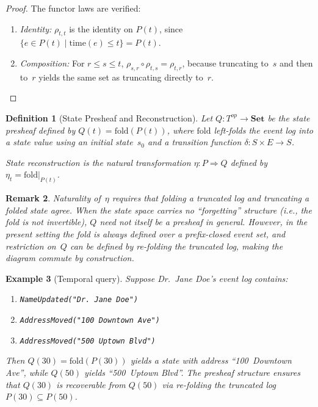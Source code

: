 \documentclass[11pt,a4paper]{article}
\newtheorem{definition}{Definition}[section]
\newtheorem{example}[definition]{Example}
\newtheorem{remark}[definition]{Remark}
\begin{document}
\begin{proof}
The functor laws are verified:
\begin{enumerate}
  \item \emph{Identity:} $\rho_{t,t}$ is the identity on $P(t)$,
    since $\{e\in P(t)\mid\mathrm{time}(e)\le t\}=P(t)$.
  \item \emph{Composition:} For $r\le s\le t$,
    $\rho_{s,r}\circ\rho_{t,s}=\rho_{t,r}$, because truncating to~$s$
    and then to~$r$ yields the same set as truncating directly to~$r$.
    \qedhere
\end{enumerate}
\end{proof}

\begin{definition}[State Presheaf and Reconstruction]
\label{def:state-presheaf}
Let $Q:T^{op}\to\mathbf{Set}$ be the \emph{state presheaf} defined by
$Q(t)=\mathrm{fold}(P(t))$, where $\mathrm{fold}$ left-folds the
event log into a state value using an initial state~$s_0$ and a
transition function $\delta:S\times E\to S$.

State reconstruction is the natural transformation
$\eta:P\Rightarrow Q$ defined by $\eta_t = \mathrm{fold}|_{P(t)}$.
\end{definition}

\begin{remark}
\label{rem:fold-nat-trans}
Naturality of~$\eta$ requires that folding a truncated log and
truncating a folded state agree. When the state space carries no
``forgetting'' structure (i.e., the fold is not invertible), $Q$ need not
itself be a presheaf in general. However, in the present setting the fold is
always defined over a prefix-closed event set, and restriction on~$Q$
can be defined by re-folding the truncated log, making the diagram
commute by construction.
\end{remark}

\begin{example}[Temporal query]
\label{ex:temporal-query}
Suppose Dr.~Jane Doe's event log contains:
\begin{enumerate}
  \item[$t\!=\!10$:] \texttt{NameUpdated("Dr.~Jane Doe")}
  \item[$t\!=\!20$:] \texttt{AddressMoved("100 Downtown Ave")}
  \item[$t\!=\!50$:] \texttt{AddressMoved("500 Uptown Blvd")}
\end{enumerate}
Then $Q(30) = \mathrm{fold}(P(30))$ yields a state with address
``100~Downtown Ave'', while $Q(50)$ yields ``500~Uptown Blvd''.
The presheaf structure ensures that $Q(30)$ is recoverable from $Q(50)$
via re-folding the truncated log $P(30)\subseteq P(50)$.
\end{example}
\end{document}
